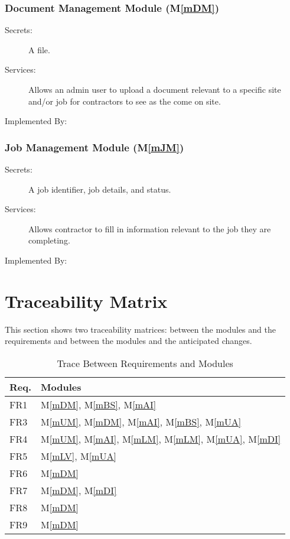 \documentclass[12pt, titlepage]{article}
\newcommand{\mref}[1]{M\ref{#1}}
\begin{document}
\subsubsection{Document Management Module (\mref{mDM})}
\begin{description}
  \item[Secrets:] A file.
  \item[Services:] Allows an admin user to upload a document relevant
    to a specific site and/or job for contractors to see as the come on site.
  \item[Implemented By:] \progname
\end{description}

\subsubsection{Job Management Module (\mref{mJM})}
\begin{description}
  \item[Secrets:] A job identifier, job details, and status.
  \item[Services:] Allows contractor to fill in information relevant
    to the job they are completing.
  \item[Implemented By:] \progname
\end{description}

\section{Traceability Matrix} \label{SecTM}

This section shows two traceability matrices: between the modules and the
requirements and between the modules and the anticipated changes.

\begin{table}[H]
  \centering
  \begin{tabular}{p{} p{}}
    \toprule
    \textbf{Req.} & \textbf{Modules}
    \\
    \midrule
    FR1            & \mref{mDM}, \mref{mBS}, \mref{mAI}
    \\
    FR3            & \mref{mUM}, \mref{mDM}, \mref{mAI}, \mref{mBS}, \mref{mUA}
    \\
    FR4            & \mref{mUM}, \mref{mAI}, \mref{mLM}, \mref{mLM},
    \mref{mUA}, \mref{mDI}
    \\
    FR5            & \mref{mLV}, \mref{mUA}
    \\
    FR6            & \mref{mDM}
    \\
    FR7            & \mref{mDM}, \mref{mDI}
    \\
    FR8            & \mref{mDM}
    \\
    FR9            & \mref{mDM}
    \\
    \bottomrule
  \end{tabular}
  \caption{Trace Between Requirements and Modules}
  \label{TblRT}
\end{table}
\end{document}
